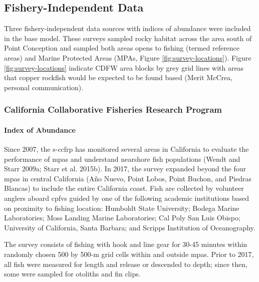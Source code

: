 \documentclass[11pt,
  english,
  letterpaper,
]{article}
\begin{document}
\hypertarget{fishery-independent-data}{%
\subsection{Fishery-Independent Data}\label{fishery-independent-data}}

Three fishery-independent data sources with indices of abundance were included in the base model. These surveys sampled rocky habitat across the area south of Point Conception and sampled both areas opens to fishing (termed reference areas) and Marine Protected Areas (MPAs, Figure \ref{fig:survey-locations}). Figure \ref{fig:survey-locations} indicate CDFW area blocks by grey grid lines with areas that copper rockfish would be expected to be found based (Merit McCrea, personal communication).

\hypertarget{california-collaborative-fisheries-research-program}{%
\subsubsection{California Collaborative Fisheries Research Program}\label{california-collaborative-fisheries-research-program}}

\hypertarget{index-of-abundance}{%
\paragraph{Index of Abundance}\label{index-of-abundance}}

\hfill\break

Since 2007, the \gls{s-ccfrp} has monitored several areas in California to evaluate the performance of \glspl{mpa} and understand nearshore fish populations (Wendt and Starr 2009a; Starr et al. 2015b). In 2017, the survey expanded beyond the four \Gls{mpa}s in central California (Año Nuevo, Point Lobos, Point Buchon, and Piedras Blancas) to include the entire California coast. Fish are collected by volunteer anglers aboard \glspl{cpfv} guided by one of the following academic institutions based on proximity to fishing location: Humboldt State University; Bodega Marine Laboratories; Moss Landing Marine Laboratories; Cal Poly San Luis Obispo; University of California, Santa Barbara; and Scripps Institution of Oceanography.

The survey consists of fishing with hook and line gear for 30-45 minutes within randomly chosen 500 by 500-m grid cells within and outside \glspl{mpa}. Prior to 2017, all fish were measured for length and release or descended to depth; since then, some were sampled for otoliths and fin clips.
\end{document}
